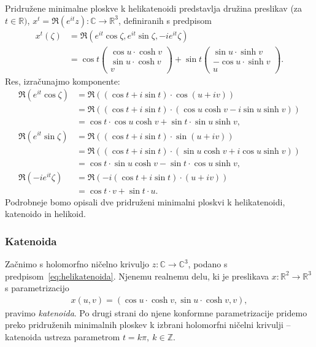 \documentclass[12pt,a4paper,twoside]{article}
\theoremstyle{definition} %
\theoremstyle{plain} %
\numberwithin{equation}{section}  %
\begin{document}
Pridružene minimalne ploskve k helikatenoidi predstavlja družina preslikav (za $t \in \mathbb{R})$, $x^{t} = \Re (e^{it} z) \colon \mathbb{C} \to \mathbb{R}^3$, definiranih s predpisom
%
\begin{align} \label{eq:pridruzene-helikatenoida}
x^{t}(\zeta) &= \Re (e^{it} \cos \zeta, e^{it} \sin \zeta, -i e^{it} \zeta) \nonumber \\
	&= \cos t  
		\begin{pmatrix}
		\cos u \cdot \cosh v \\
		\sin u \cdot \cosh v \\
		v
         	\end{pmatrix}
	+ \sin t
		\begin{pmatrix}
		\sin u \cdot \sinh v \\
		-\cos u \cdot \sinh v \\
		u
         	\end{pmatrix}.
\end{align}
%
Res, izračunajmo komponente:
\begin{align*}
\Re (e^{it} \cos \zeta) &= \Re \left( (\cos t + i\sin t) \cdot \cos(u+iv) \right) \\
	&= \Re \left( (\cos t + i\sin t) \cdot (\cos u \cosh v - i\sin u \sinh v) \right) \\
	&= \cos t \cdot \cos u \cosh v + \sin t \cdot \sin u \sinh v, \\
\Re (e^{it} \sin \zeta) &= \Re \left( (\cos t + i\sin t) \cdot \sin(u+iv) \right) \\
	&= \Re \left( (\cos t + i\sin t) \cdot (\sin u \cosh v + i\cos u \sinh v) \right) \\
	&= \cos t \cdot \sin u \cosh v - \sin t \cdot \cos u \sinh v, \\
\Re (-i e^{it} \zeta) &= \Re \left( -i(\cos t + i\sin t) \cdot (u+iv) \right) \\
	&= \cos t \cdot v + \sin t \cdot u.
\end{align*}
Podrobneje bomo opisali dve pridruženi minimalni ploskvi k helikatenoidi, katenoido in helikoid.

\subsubsection{Katenoida}
%
Začnimo s holomorfno ničelno krivuljo $z \colon \mathbb{C} \to \mathbb{C}^3$, podano s predpisom~\ref{eq:helikatenoida}. Njenemu realnemu delu, ki je preslikava $x \colon \mathbb{R}^2 \to \mathbb{R}^3$ s parametrizacijo
\begin{align} \label{eq:katenoida}
x(u,v) = (\cos u \cdot \cosh v, \sin u \cdot \cosh v, v),
\end{align}
pravimo \emph{katenoida}. Po drugi strani do njene konformne parametrizacije pridemo preko pridruženih minimalnih ploskev k izbrani holomorfni ničelni krivulji -- katenoida ustreza parametrom $t = k \pi, \ k \in \mathbb{Z}$.
\end{document}
